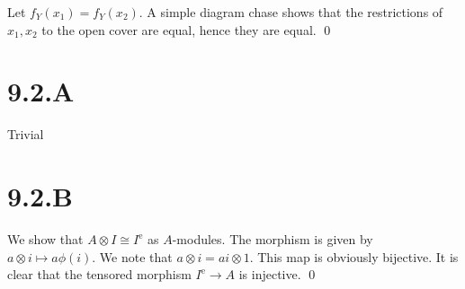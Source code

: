 \documentclass{article}
\begin{document}
Let $f_Y(x_1)=f_Y(x_2)$. A simple diagram chase shows that the restrictions
of $x_1, x_2$ to the open cover are equal, hence they are equal.
\qed

\section{9.2.A}
Trivial

\section{9.2.B}
We show that $A \otimes I \cong I^{\text{e}}$ as $A$-modules. The
morphism is given by $a \otimes i \mapsto a\phi(i)$. We note that
$a \otimes i = ai \otimes 1$. This map is obviously bijective. It is clear that the
tensored morphism $I^{\text{e}} \to A$ is injective. \qed
\end{document}
